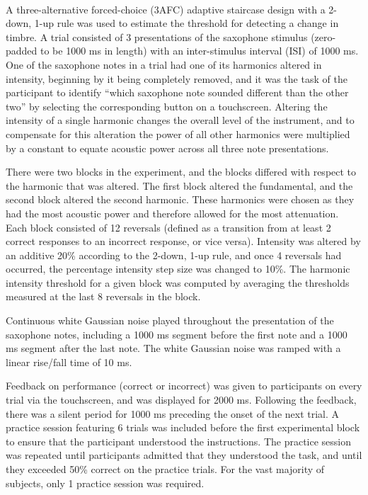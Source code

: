 \paragraph{}A three-alternative forced-choice (3AFC) adaptive staircase design \cite{Levitt1971} with a 2-down, 1-up rule was used to estimate the threshold for detecting a change in timbre.  A trial consisted of 3 presentations of the saxophone stimulus (zero-padded to be 1000 ms in length) with an inter-stimulus interval (ISI) of 1000 ms.  One of the saxophone notes in a trial had one of its harmonics altered in intensity, beginning by it being completely removed, and it was the task of the participant to identify ``which saxophone note sounded different than the other two'' by selecting the corresponding button on a touchscreen.  Altering the intensity of a single harmonic changes the overall level of the instrument, and to compensate for this alteration the power of all other harmonics were multiplied by a constant to equate acoustic power across all three note presentations.

There were two blocks in the experiment, and the blocks differed with respect to the harmonic that was altered.  The first block altered the fundamental, and the second block altered the second harmonic.  These harmonics were chosen as they had the most acoustic power and therefore allowed for the most attenuation.  Each block consisted of 12 reversals (defined as a transition from at least 2 correct responses to an incorrect response, or vice versa).  Intensity was altered by an additive 20\% according to the 2-down, 1-up rule, and once 4 reversals had occurred, the percentage intensity step size was changed to 10\%.  The harmonic intensity threshold for a given block was computed by averaging the thresholds measured at the last 8 reversals in the block.

Continuous white Gaussian noise played throughout the presentation of the saxophone notes, including a 1000 ms segment before the first note and a 1000 ms segment after the last note.  The white Gaussian noise was ramped with a linear rise/fall time of 10 ms.

Feedback on performance (correct or incorrect) was given to participants on every trial via the touchscreen, and was displayed for 2000 ms.  Following the feedback, there was a silent period for 1000 ms preceding the onset of the next trial.  A practice session featuring 6 trials was included before the first experimental block to ensure that the participant understood the instructions.  The practice session was repeated until participants admitted that they understood the task, and until they exceeded 50\% correct on the practice trials.  For the vast majority of subjects, only 1 practice session was required.

